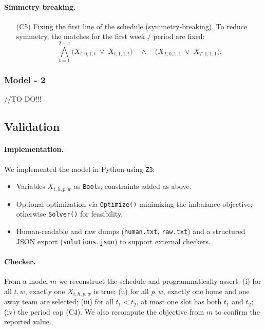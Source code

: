 \documentclass{article}
\begin{document}
\paragraph{Simmetry breaking.}

\begin{itemize}
\item[(C5)] {Fixing the first line of the schedule (symmetry-breaking).}  
To reduce symmetry, the matches for the first week / period are fixed:
\[
\bigwedge_{t=1}^{T-1} \big( X_{t,0,1,t} \;\lor\; X_{t,1,1,t} \big)
\quad\land\quad
\big( X_{T,0,1,1} \;\lor\; X_{T,1,1,1} \big).
\]
\end{itemize}

\subsubsection{Model - 2 }

//TO DO!!!



\subsection{Validation}

\paragraph{Implementation.}
We implemented the model in Python using \texttt{Z3}:
\begin{itemize}
  \item Variables \(X_{t,h,p,w}\) as \texttt{Bool}s; constraints added as above.
  \item Optional optimization via \texttt{Optimize()} minimizing the imbalance objective; otherwise \texttt{Solver()} for feasibility.
  \item Human-readable and raw dumps (\texttt{human.txt}, \texttt{raw.txt}) and a structured JSON export (\texttt{solutions.json}) to support external checkers.
\end{itemize}

\paragraph{Checker.}
From a model \(m\) we reconstruct the schedule and programmatically assert:
(i) for all \(t,w\), exactly one \(X_{t,h,p,w}\) is true; 
(ii) for all \(p,w\), exactly one home and one away team are selected; 
(iii) for all \(t_1\!<\!t_2\), at most one slot has both \(t_1\) and \(t_2\); 
(iv) the period cap (C4). We also recompute the objective from \(m\) to confirm the reported value.
\end{document}

